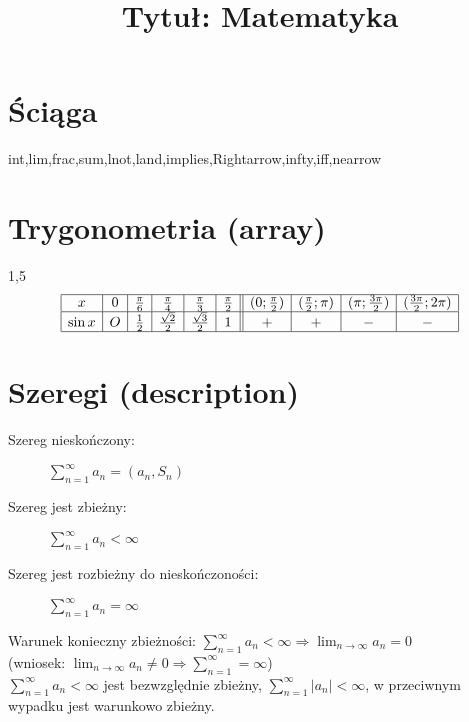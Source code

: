 \documentclass[12pt]{article}
\title{Tytuł: Matematyka}
\date{} %
\begin{document}
\maketitle %
\section*{Ściąga} %
int,lim,frac,sum,lnot,land,implies,Rightarrow,infty,iff,nearrow

\section{Trygonometria (array)}
\begin{spacing}{1,5}
{\[ \begin{array}{|c|c|c|c|c|c||c|c|c|c|rr}
  \hline	%
  x & 0 & \frac{\pi}{6} & \frac{\pi}{4} & \frac{\pi}{3} & \frac{\pi}{2} & (0;\frac{\pi}{2}) & (\frac{\pi}{2};\pi) & (\pi; \frac{3\pi}{2}) & (\frac{3\pi}{2};2\pi) \\
  \hline
  \sin x & O & \frac{1}{2} & \frac{\sqrt{2}}{2} & \frac{\sqrt{3}}{2} & 1 & + & + & - & - \\
  \hline
\end{array} \]} 
\end{spacing}
\section{Szeregi (description)}
  \begin{description}
    \item[Szereg nieskończony:] $\displaystyle\sum_{n=1}^\infty a_{n} = (a_{n},S_{n})$ %
    \item[Szereg jest zbieżny:] $\displaystyle\sum_{n=1}^\infty a_{n} < \infty $
    \item[Szereg jest rozbieżny do nieskończoności:] $\displaystyle\sum_{n=1}^\infty a_{n} = \infty $
  \end{description}
  \noindent Warunek konieczny zbieżności: $ \sum_{n=1}^\infty a_{n} < \infty \Rightarrow \lim_{n\rightarrow\infty} a_n = 0$ \\ %
  (wniosek: $ \displaystyle \lim_{n\rightarrow\infty} a_n \neq 0 \Rightarrow \sum_{n=1}^\infty = \infty$) \\
  $ \displaystyle\sum_{n=1}^\infty a_n < \infty $ jest bezwzględnie zbieżny,	$ \displaystyle\sum_{n=1}^\infty 
  |a_n| < \infty $, w przeciwnym wypadku jest warunkowo zbieżny.
\end{document}
